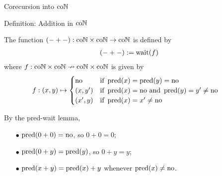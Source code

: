 \begin{frame}{Corecursion into $\mathrm{co}\mathbb{N}$} %
  
  \begin{block}{Definition: Addition in $\mathrm{co}\mathbb{N}$}
    
    \par The function $({-} + {-}) : \mathrm{co}\mathbb{N} \times \mathrm{co}\mathbb{N} \to \mathrm{co}\mathbb{N}$ is defined by
    \begin{align*}
      ({-} + {-}) := \operatorname{wait}(f)
    \end{align*}
    where $f : \mathrm{co}\mathbb{N} \times \mathrm{co}\mathbb{N} \nrightarrow \mathrm{co}\mathbb{N} \times \mathrm{co}\mathbb{N}$ is given by
    \begin{align*}
      f : (x, y)
      &\mapsto
      \begin{cases}
        \mathrm{no} & \text{if } \operatorname{pred}(x) = \operatorname{pred}(y) = \mathrm{no} \\
        (x, y') &\text{if } \operatorname{pred}(x) = \mathrm{no} \text{ and } \operatorname{pred}(y) = y' \neq \mathrm{no} \\
        (x', y) &\text{if } \operatorname{pred}(x) = x' \neq \mathrm{no}
      \end{cases}
    \end{align*}

  \end{block}

  \pause

  \par By the pred-wait lemma,{\pause}
  \begin{itemize}[nosep]
    \item[$\bullet$] {
      $\operatorname{pred} (0 + 0) = \mathrm{no}$, so $0 + 0 = 0$;
    }\pause
    \item[$\bullet$] {
      $\operatorname{pred}(0 + y) = \operatorname{pred}(y)$, so $0 + y = y$;
    }\pause
    \item[$\bullet$] {
      $\operatorname{pred}(x + y) = \operatorname{pred}(x) + y$ whenever $\operatorname{pred}(x) \neq \mathrm{no}$.
    }
  \end{itemize}

\end{frame}
